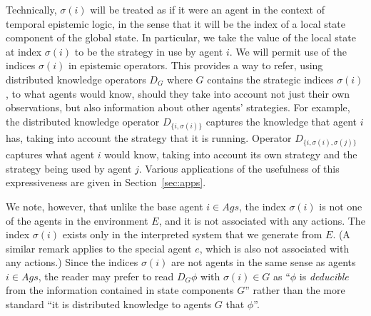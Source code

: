 \documentclass[a4wide]{article}
\theoremstyle{examplesty}
\newcommand{\strat}{\sigma}
\newcommand{\Ags}{\mathit{Ags}}
\newcommand{\Env}{E}
\begin{document}
 
 Technically, $\strat(i)$ will be treated as 
if it were 
 an agent in the context of 
 temporal epistemic logic, 
in the sense that it will be the index of a local state component of the global state. 
In particular, we 
  take the value of the local state
at index 
 $\sigma(i)$ to be the strategy in use by agent $i$. 
 We will permit use of the 
indices 
 $\sigma(i)$ in epistemic operators. 
This provides a way to refer, using distributed knowledge operators $D_G$ where 
$G$ contains the 
strategic indices
$\strat(i)$,  to 
what agents would know, should they take into account not
just their own observations, but also information about other agents' strategies.
For example, the distributed knowledge 
operator $D_{\{i,\strat(i)\}}$ captures the knowledge that  agent $i$ has, 
taking into account the strategy that it is running.  
Operator
$D_{\{i,\strat(i), \strat(j)\}}$ captures what agent $i$ would know, 
taking into account its own strategy and the strategy being used by agent $j$. 
Various applications of the usefulness of this expressiveness are given in 
Section~\ref{sec:apps}. 

 We note, however, that 
 unlike the base agent $i \in \Ags$, the 
index 
 $\strat(i)$ is not
 one of the agents in the environment $\Env$, and it is not associated with any actions. 
 The 
index 
 $\strat(i)$ exists only in the interpreted system that we generate from $\Env$. 
(A similar remark applies to the special  agent $e$, which is also 
not associated with any actions.) 
Since the indices $\strat(i)$ are not agents in the same sense as agents $i \in \Ags$, the  
reader may prefer to read $D_G\phi$ with $\strat(i)\in G$ as ``$\phi$ is \emph{deducible} from the 
information contained in state components $G$'' rather than the more standard 
``it is distributed knowledge to agents $G$ that $\phi$''.
\end{document}
